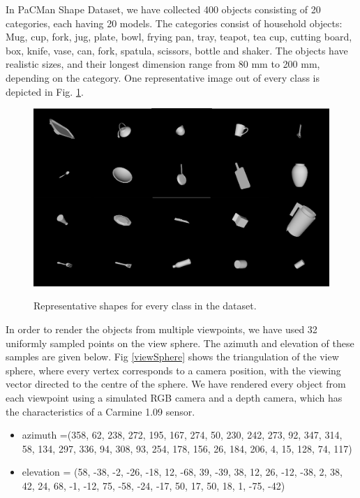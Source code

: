 \documentclass[12pt]{article}
\begin{document}
\maketitle

In PaCMan Shape Dataset, we have collected 400 objects consisting of 20 categories, each having 20 models. The categories consist of household objects: Mug, cup, fork, jug, plate, bowl, frying pan, tray, teapot, tea cup, cutting board, box, knife, vase, can, fork, spatula, scissors, bottle and shaker. The objects have realistic sizes, and their longest dimension range from 80 mm to 200 mm, depending on the category. One representative image out of every class is depicted in Fig. \ref{shapes}.

 \begin{figure}[!h]
  \caption{Representative shapes for every class in the dataset.}
  \centering
    \includegraphics[width=\textwidth]{shapes.png}
\label{shapes}
\end{figure}

In order to render the objects from multiple viewpoints, we have used 32 uniformly sampled points on the view sphere. The azimuth and elevation of these samples are given below. Fig \ref{viewSphere} shows the triangulation of the view sphere, where every vertex corresponds to a camera position, with the viewing vector directed to the centre of the sphere. We have  rendered every object from each viewpoint using a simulated RGB camera and a depth camera, which has the characteristics of a Carmine 1.09 sensor.
 
 
\begin{itemize}
\item azimuth =(358, 62, 238, 272, 195, 167, 274, 50, 230, 242, 273, 92, 347, 314, 58, 134, 297, 336, 94, 308, 93, 254, 178, 156, 26, 184, 206, 4, 15, 128, 74, 117)
\item elevation = (58, -38, -2, -26, -18, 12, -68, 39, -39, 38, 12, 26, -12, -38, 2, 38, 42, 24, 68, -1, -12, 75, -58, -24, -17, 50, 17, 50, 18, 1, -75, -42)
\end{itemize}
\end{document}
